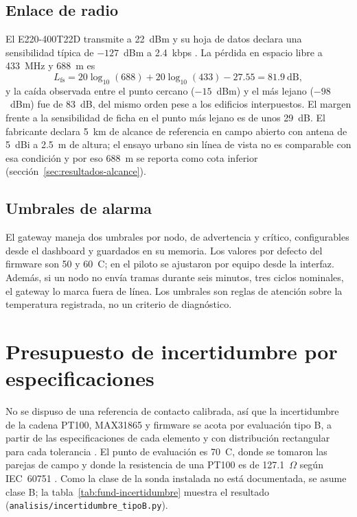 \subsection{Enlace de radio}
El E220-400T22D transmite a 22~dBm y su hoja de datos declara una sensibilidad típica de $-127$~dBm a 2.4~kbps \citep{e220manual}. La pérdida en espacio libre a 433~MHz y 688~m es
\begin{equation}
L_{\mathrm{fs}}=20\log_{10}(688)+20\log_{10}(433)-27.55=81.9~\mathrm{dB},
\label{eq:fund-fspl}
\end{equation}
y la caída observada entre el punto cercano ($-15$~dBm) y el más lejano ($-98$~dBm) fue de 83~dB, del mismo orden pese a los edificios interpuestos. El margen frente a la sensibilidad de ficha en el punto más lejano es de unos 29~dB. El fabricante declara 5~km de alcance de referencia en campo abierto con antena de 5~dBi a 2.5~m de altura; el ensayo urbano sin línea de vista no es comparable con esa condición y por eso 688~m se reporta como cota inferior (sección~\ref{sec:resultados-alcance}).

\subsection{Umbrales de alarma}
El gateway maneja dos umbrales por nodo, de advertencia y crítico, configurables desde el dashboard y guardados en su memoria. Los valores por defecto del firmware son 50 y 60~\textdegree C; en el piloto se ajustaron por equipo desde la interfaz. Además, si un nodo no envía tramas durante seis minutos, tres ciclos nominales, el gateway lo marca fuera de línea. Los umbrales son reglas de atención sobre la temperatura registrada, no un criterio de diagnóstico.

\section{Presupuesto de incertidumbre por especificaciones}
\label{sec:fund-incertidumbre}
No se dispuso de una referencia de contacto calibrada, así que la incertidumbre de la cadena PT100, MAX31865 y firmware se acota por evaluación tipo B, a partir de las especificaciones de cada elemento y con distribución rectangular para cada tolerancia \citep{jcgm2008}. El punto de evaluación es 70~\textdegree C, donde se tomaron las parejas de campo y donde la resistencia de una PT100 es de 127.1~$\Omega$ según IEC~60751 \citep{iec60751}. Como la clase de la sonda instalada no está documentada, se asume clase B; la tabla~\ref{tab:fund-incertidumbre} muestra el resultado (\texttt{analisis/incertidumbre\_tipoB.py}).

